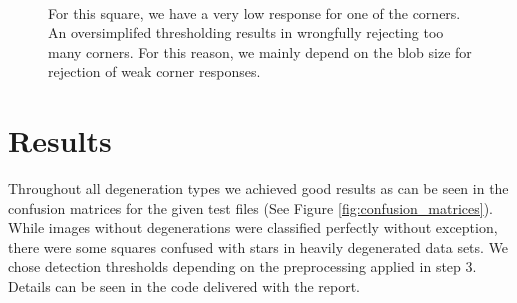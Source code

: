 \documentclass[conference]{IEEEtran}
\begin{document}
\begin{figure}%
\centering
{}
 \\
\caption{For this square, we have a very low response for one of the corners. 
An oversimplifed thresholding results in wrongfully rejecting too many corners. 
For this reason, we mainly depend on the blob size for
rejection of weak corner responses.}
\label{fig:blob_rejection}
\end{figure}

\section{Results}
\label{sec:results}

Throughout all degeneration types we achieved good results as can be seen in the confusion matrices
for the given test files (See Figure \ref{fig:confusion_matrices}). 
While images without degenerations were classified perfectly without exception, 
there were some squares confused with stars in heavily degenerated data sets. 
We chose detection thresholds depending on the preprocessing applied in step 3.
Details can be seen in the code delivered with the report.
 
\end{document}
